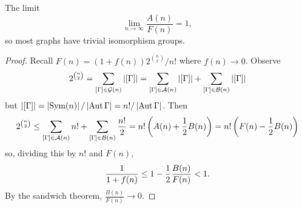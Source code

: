 \begin{theorem}
  The limit
  \[
	\lim_{n \to \infty} \frac{A(n)}{F(n)} = 1,
  \]
  so most graphs have trivial isomorphism groups.
\end{theorem}

\begin{proof}
  Recall $F(n) = (1 + f(n)) 2^{\binom{n}{2}} / n!$ where $f(n) \to 0$.
  Observe
  \[
	2^{\binom{n}{2}}
	= \sum_{[\Gamma] \in \mathcal{G}(n)} \left| [\Gamma] \right|
	= \sum_{[\Gamma] \in \mathcal{A}(n)} \left| [\Gamma] \right|
	+ \sum_{[\Gamma] \in \mathcal{B}(n)} \left| [\Gamma] \right|
  \]
  but $\left| [\Gamma] \right| = \left| \operatorname{Sym}(n) \right| / \left| \operatorname{Aut} \Gamma \right| = n! / \left| \operatorname{Aut}
	\Gamma \right|$.
  Then
  \[
	2^{\binom{n}{2}}
	\le \sum_{[\Gamma] \in \mathcal{A}(n)} n!
	+ \sum_{[\Gamma] \in \mathcal{B}(n)} \frac{n!}{2}
	= n! \left( A(n) + \frac{1}{2} B(n) \right)
	= n! \left( F(n) - \frac{1}{2} B(n) \right)
  \]
  so, dividing this by $n!$ and $F(n)$,
  \[
	\frac{1}{1 + f(n)} \le 1 - \frac{1}{2} \frac{B(n)}{F(n)}
	< 1.
  \]
  By the sandwich theorem, $\frac{B(n)}{F(n)} \to 0$.
\end{proof}

